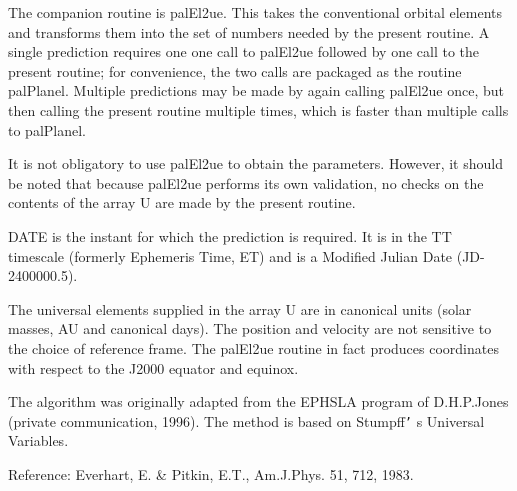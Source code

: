 \documentclass[twoside,11pt,nolof]{starlink}
\begin{document}
{{{         \sstitem
          The companion routine is palEl2ue.  This takes the conventional
           orbital elements and transforms them into the set of numbers
           needed by the present routine.  A single prediction requires one
           one call to palEl2ue followed by one call to the present routine;
           for convenience, the two calls are packaged as the routine
           palPlanel.  Multiple predictions may be made by again
           calling palEl2ue once, but then calling the present routine
           multiple times, which is faster than multiple calls to palPlanel.

         \sstitem
          It is not obligatory to use palEl2ue to obtain the parameters.
           However, it should be noted that because palEl2ue performs its
           own validation, no checks on the contents of the array U are made
           by the present routine.

         \sstitem
          DATE is the instant for which the prediction is required.  It is
           in the TT timescale (formerly Ephemeris Time, ET) and is a
           Modified Julian Date (JD-2400000.5).

         \sstitem
          The universal elements supplied in the array U are in canonical
           units (solar masses, AU and canonical days).  The position and
           velocity are not sensitive to the choice of reference frame.  The
           palEl2ue routine in fact produces coordinates with respect to the
           J2000 equator and equinox.

         \sstitem
          The algorithm was originally adapted from the EPHSLA program of
           D.H.P.Jones (private communication, 1996).  The method is based
           on Stumpff\texttt{'} s Universal Variables.

         \sstitem
          Reference:  Everhart, E. \& Pitkin, E.T., Am.J.Phys. 51, 712, 1983.
      }
   }
}
\end{document}
